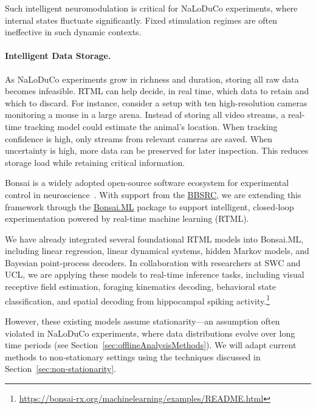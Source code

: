 Such intelligent neuromodulation is critical for NaLoDuCo experiments, where internal states fluctuate significantly. Fixed stimulation regimes are often ineffective in such dynamic contexts.

\paragraph{Intelligent Data Storage.}
As NaLoDuCo experiments grow in richness and duration, storing all raw data becomes infeasible. RTML can help decide, in real time, which data to retain and which to discard. For instance, consider a setup with ten high-resolution cameras monitoring a mouse in a large arena. Instead of storing all video streams, a real-time tracking model could estimate the animal's location. When tracking confidence is high, only streams from relevant cameras are saved. When uncertainty is high, more data can be preserved for later inspection. This reduces storage load while retaining critical information.

\label{sec:bonsai}

Bonsai is a widely adopted open-source software ecosystem for experimental control in neuroscience~\citep{lopesEtAl15}. With support from the \href{https://gow.bbsrc.ukri.org/grants/AwardDetails.aspx?FundingReference=BB\%2FW019132\%2F1}{BBSRC}, we are extending this framework through the \href{https://bonsai-rx.org/machinelearning/}{Bonsai.ML} package to support intelligent, closed-loop experimentation powered by real-time machine learning (RTML).

We have already integrated several foundational RTML models into Bonsai.ML, including linear regression, linear dynamical systems, hidden Markov models, and Bayesian point-process decoders. In collaboration with researchers at SWC and UCL, we are applying these models to real-time inference tasks, including visual receptive field estimation, foraging kinematics decoding, behavioral state classification, and spatial decoding from hippocampal spiking activity.\footnote{\url{https://bonsai-rx.org/machinelearning/examples/README.html}}

However, these existing models assume stationarity—an assumption often violated in NaLoDuCo experiments, where data distributions evolve over long time periods (see Section~\ref{sec:offlineAnalysisMethods}). We will adapt current methods to non-stationary settings using the techniques discussed in Section~\ref{sec:non-stationarity}.

